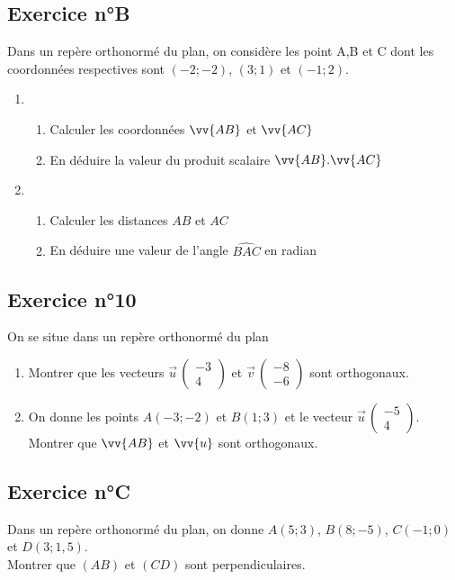 \documentclass[12pt,a4paper]{article}
\newcommand*{\Coord}[3]{%
  \ensuremath{\overrightarrow{#1}\, 
    \begin{pmatrix} 
      #2\\ 
      #3 
    \end{pmatrix}}}
\begin{document}
\subsection*{Exercice n°B}

Dans un repère orthonormé du plan, on considère les point A,B et C dont les coordonnées respectives sont $(-2;-2)$, $(3;1)$ et $(-1;2)$.
\begin{enumerate}
    \item 
    \begin{enumerate}
        \item Calculer les coordonnées $\vv{AB}$ et $\vv{AC}$
        \item En déduire la valeur du produit scalaire $\vv{AB}.\vv{AC}$
    \end{enumerate}
    \item
    \begin{enumerate}
        \item Calculer les distances $AB$ et $AC$
        \item En déduire une valeur de l'angle $\widehat{BAC}$ en radian
    \end{enumerate}

\end{enumerate}

\subsection*{Exercice n°10} 

On se situe dans un repère orthonormé du plan

\begin{enumerate}
    \item Montrer que les vecteurs $\Coord{u}{-3}{4}$ et $\Coord{v}{-8}{-6}$ sont orthogonaux.
    \item On donne les points $A(-3;-2)$ et $B(1;3)$ et le vecteur $\Coord{u}{-5}{4}$. \\
    Montrer que $\vv{AB}$ et $\vv{u}$ sont orthogonaux.
\end{enumerate}

\subsection*{Exercice n°C} 

Dans un repère orthonormé du plan, on donne $A(5;3)$, $B(8;-5)$, $C(-1;0)$ et $D(3;1,5)$.\\
Montrer que $(AB)$ et $(CD)$ sont perpendiculaires.
\end{document}
